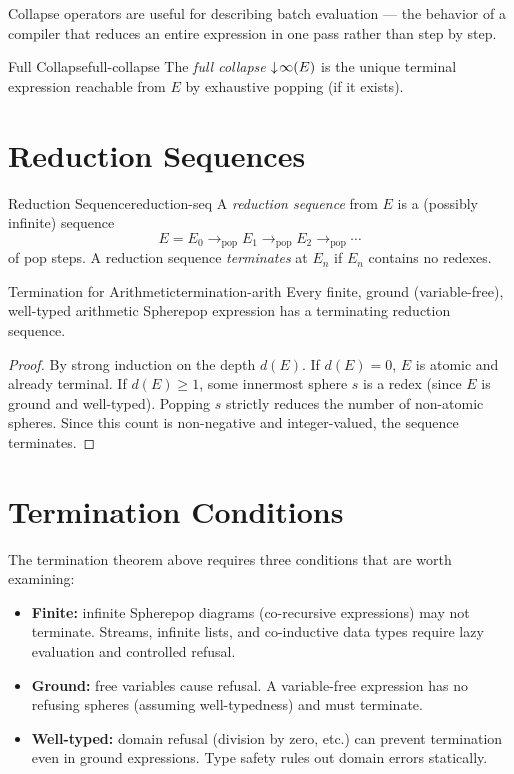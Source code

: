 Collapse operators are useful for describing batch evaluation — the
behavior of a compiler that reduces an entire expression in one pass
rather than step by step.

\begin{definition}{Full Collapse}{full-collapse}
  The \emph{full collapse} $\downarrow\!\infty(E)$ is the unique terminal
  expression reachable from $E$ by exhaustive popping (if it exists).
\end{definition}

\section{Reduction Sequences}

\begin{definition}{Reduction Sequence}{reduction-seq}
  A \emph{reduction sequence} from $E$ is a (possibly infinite) sequence
  \[
    E = E_0 \to_\text{pop} E_1 \to_\text{pop} E_2 \to_\text{pop} \cdots
  \]
  of pop steps. A reduction sequence \emph{terminates} at $E_n$ if
  $E_n$ contains no redexes.
\end{definition}

\begin{theorem}{Termination for Arithmetic}{termination-arith}
  Every finite, ground (variable-free), well-typed arithmetic Spherepop
  expression has a terminating reduction sequence.
\end{theorem}

\begin{proof}
  By strong induction on the depth $d(E)$. If $d(E) = 0$, $E$ is atomic
  and already terminal. If $d(E) \geq 1$, some innermost sphere $s$ is
  a redex (since $E$ is ground and well-typed). Popping $s$ strictly
  reduces the number of non-atomic spheres. Since this count is
  non-negative and integer-valued, the sequence terminates.
\end{proof}

\section{Termination Conditions}

The termination theorem above requires three conditions that are worth
examining:

\begin{itemize}
  \item \textbf{Finite:} infinite Spherepop diagrams (co-recursive
        expressions) may not terminate. Streams, infinite lists, and
        co-inductive data types require lazy evaluation and controlled
        refusal.
  \item \textbf{Ground:} free variables cause refusal. A variable-free
        expression has no refusing spheres (assuming well-typedness)
        and must terminate.
  \item \textbf{Well-typed:} domain refusal (division by zero, etc.)
        can prevent termination even in ground expressions.
        Type safety rules out domain errors statically.
\end{itemize}

